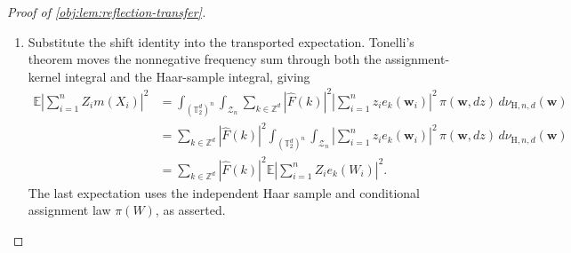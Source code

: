 \begin{proof}[Proof of \cref{obj:lem:reflection-transfer}]
\begin{enumerate}
\item Substitute the shift identity into the transported expectation.
Tonelli's theorem moves the nonnegative frequency sum through both the
assignment-kernel integral and the Haar-sample integral, giving
\[
\begin{aligned}
\mathbb E\left|\sum_{i=1}^n Z_i m(X_i)\right|^2
&=
\int_{(\mathbb T_2^d)^n}\int_{\mathcal Z_n}
\sum_{k\in\mathbb Z^d}
|\widehat F(k)|^2
\left|\sum_{i=1}^n z_i e_k(\mathbf w_i)\right|^2
\,\pi(\mathbf w,dz)\,d\nu_{\mathrm H,n,d}(\mathbf w)\\
&=
\sum_{k\in\mathbb Z^d}|\widehat F(k)|^2
\int_{(\mathbb T_2^d)^n}\int_{\mathcal Z_n}
\left|\sum_{i=1}^n z_i e_k(\mathbf w_i)\right|^2
\,\pi(\mathbf w,dz)\,d\nu_{\mathrm H,n,d}(\mathbf w)\\
&=
\sum_{k\in\mathbb Z^d}|\widehat F(k)|^2
\mathbb E\left|\sum_{i=1}^n Z_i e_k(W_i)\right|^2.
\end{aligned}
\]
The last expectation uses the independent Haar sample and conditional
assignment law \(\pi(W)\), as asserted.
\end{enumerate}
\end{proof}

